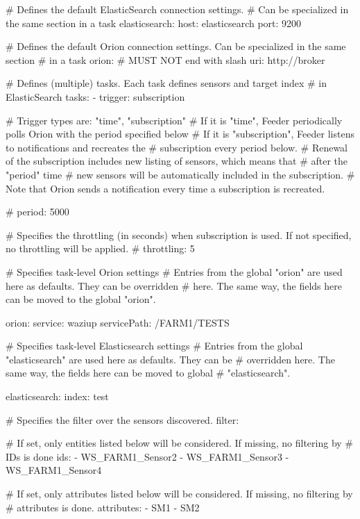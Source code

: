 # Defines the default ElasticSearch connection settings.
# Can be specialized in the same section in a task
elasticsearch:
  host: elasticsearch
  port: 9200

# Defines the default Orion connection settings. Can be specialized in the same section 
# in a task
orion:
  # MUST NOT end with slash
  uri: http://broker

# Defines (multiple) tasks. Each task defines sensors and target index 
# in ElasticSearch
tasks:
- trigger: subscription

#  Trigger types are: "time", "subscription"
#  If it is "time", Feeder periodically polls Orion with the period specified below
#  If it is "subscription", Feeder listens to notifications and recreates the
#    subscription every period below.
#  Renewal of the subscription includes new listing of sensors, which means that
#    after the "period" time
#  new sensors will be automatically included in the subscription.
#  Note that Orion sends a notification every time a subscription is recreated.

#  period: 5000

# Specifies the throttling (in seconds) when subscription is used. If not specified, no throttling will be applied.
# throttling: 5

#  Specifies task-level Orion settings
#  Entries from the global "orion" are used here as defaults. They can be overridden
#  here. The same way,  the fields here can be moved to the global "orion".

  orion:
    service: waziup
    servicePath: /FARM1/TESTS

#  Specifies task-level Elasticsearch settings
#  Entries from the global "elasticsearch" are used here as defaults. They can be
#  overridden here. The same way, the fields here can be moved to global 
#  "elasticsearch".

  elasticsearch:
    index: test

#  Specifies the filter over the sensors discovered.
  filter:

#  If set, only entities listed below will be considered. If missing, no filtering by 
#  IDs is done
    ids:
    - WS_FARM1_Sensor2
    - WS_FARM1_Sensor3
    - WS_FARM1_Sensor4

#  If set, only attributes listed below will be considered. If missing, no filtering by 
#  attributes is done.
    attributes:
    - SM1
    - SM2



